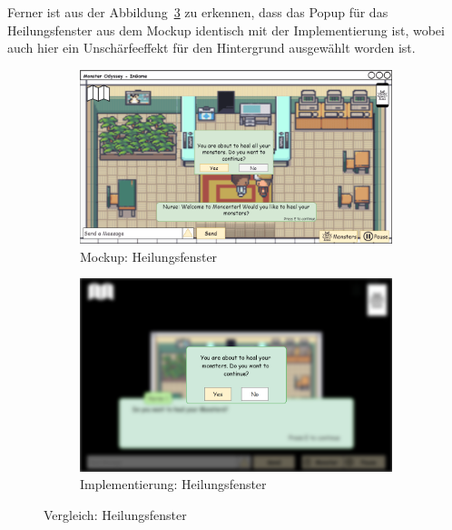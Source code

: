 Ferner ist aus der Abbildung~\ref{fig: Vergleich: Heilungsfenster} zu erkennen, dass das Popup für das Heilungsfenster aus dem Mockup identisch mit der Implementierung ist, wobei auch hier ein Unschärfeeffekt für den Hintergrund ausgewählt worden ist. 
\begin{figure}[H]
    \centering
    \begin{subfigure}[b]{0.4\textwidth}
        \includegraphics[width=\textwidth]{images/mockups/Heilung/PlayerInMoncenterHealingPopUp.png}
        \caption{Mockup: Heilungsfenster}
        \label{fig: Mockup: Heilungsfenster}
    \end{subfigure}
    \hfill
    \begin{subfigure}[b]{0.4\textwidth}
        \includegraphics[width=\textwidth]{images/implementation/Heilung/PopupImplementation.png}
        \caption{Implementierung: Heilungsfenster}
        \label{fig: Implementierung: Heilungsfenster}
    \end{subfigure}
    \caption{Vergleich: Heilungsfenster}
    \label{fig: Vergleich: Heilungsfenster}
\end{figure}